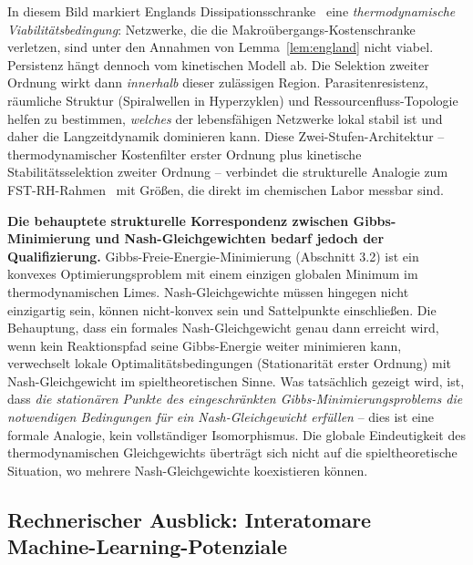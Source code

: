 \documentclass[12pt,a4paper]{article}
\theoremstyle{remark}
\begin{document}
In diesem Bild markiert Englands Dissipationsschranke~\citep{England2013} eine
\emph{thermodynamische Viabilitätsbedingung}: Netzwerke, die die
Makroübergangs-Kostenschranke verletzen, sind unter den Annahmen von
Lemma~\ref{lem:england} nicht viabel.  Persistenz hängt dennoch vom
kinetischen Modell ab.  Die Selektion zweiter Ordnung wirkt dann
\emph{innerhalb} dieser zulässigen Region.  Parasitenresistenz, räumliche
Struktur (Spiralwellen in Hyperzyklen) und Ressourcenfluss-Topologie helfen zu
bestimmen, \emph{welches} der lebensfähigen Netzwerke lokal stabil ist und
daher die Langzeitdynamik dominieren kann.
Diese Zwei-Stufen-Architektur -- thermodynamischer Kostenfilter erster Ordnung
plus kinetische Stabilitätsselektion zweiter Ordnung -- verbindet die
strukturelle Analogie zum FST-RH-Rahmen~\citep{GeigerRH2026b} mit Größen,
die direkt im chemischen Labor messbar sind.

\textbf{Die behauptete strukturelle Korrespondenz zwischen Gibbs-Minimierung und Nash-Gleichgewichten bedarf jedoch der Qualifizierung.} Gibbs-Freie-Energie-Minimierung (Abschnitt 3.2) ist ein konvexes Optimierungsproblem mit einem einzigen globalen Minimum im thermodynamischen Limes. Nash-Gleichgewichte müssen hingegen nicht einzigartig sein, können nicht-konvex sein und Sattelpunkte einschließen. Die Behauptung, dass \glqq ein formales Nash-Gleichgewicht genau dann erreicht wird, wenn kein Reaktionspfad seine Gibbs-Energie weiter minimieren kann\grqq{}, verwechselt lokale Optimalitätsbedingungen (Stationarität erster Ordnung) mit Nash-Gleichgewicht im spieltheoretischen Sinne. Was tatsächlich gezeigt wird, ist, dass \emph{die stationären Punkte des eingeschränkten Gibbs-Minimierungsproblems die notwendigen Bedingungen für ein Nash-Gleichgewicht erfüllen} -- dies ist eine formale Analogie, kein vollständiger Isomorphismus. Die globale Eindeutigkeit des thermodynamischen Gleichgewichts überträgt sich nicht auf die spieltheoretische Situation, wo mehrere Nash-Gleichgewichte koexistieren können.

\subsection{Rechnerischer Ausblick: Interatomare Machine-Learning-Potenziale}
\end{document}
